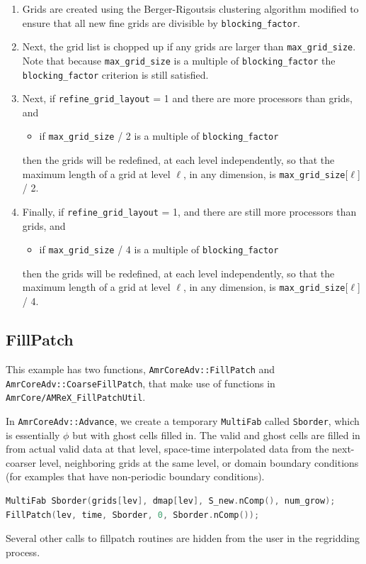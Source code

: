 \begin{enumerate}
\item Grids are created using the Berger-Rigoutsis clustering algorithm
modified to ensure that all new fine grids are divisible by {\tt blocking\_factor}.

\item Next, the grid list is chopped up if any grids are larger than {\tt max\_grid\_size}.
Note that because {\tt max\_grid\_size} is a multiple of {\tt blocking\_factor}
the {\tt blocking\_factor} criterion is still satisfied.

\item Next, if {\tt refine\_grid\_layout} = 1 and there are more processors than grids, and
\begin{itemize}
\item if {\tt max\_grid\_size} / 2 is a multiple of {\tt blocking\_factor}
\end{itemize}
then the grids will be redefined, at each level independently, so that the
maximum length of a grid at level $\ell$, in any dimension,
is {\tt max\_grid\_size}[$\ell$] / 2.

\item Finally, if {\tt refine\_grid\_layout} = 1,  and there are still more processors
than grids, and
\begin{itemize}
\item if {\tt max\_grid\_size} / 4 is a multiple of {\tt blocking\_factor}
\end{itemize}
then the grids will be redefined, at each level independently, so that the
maximum length of a grid at level $\ell$, in any dimension,
is {\tt max\_grid\_size}[$\ell$] / 4.

\end{enumerate}

\subsection{FillPatch}
This example has two functions, {\tt AmrCoreAdv::FillPatch} and {\tt AmrCoreAdv::CoarseFillPatch},
that make use of functions in {\tt AmrCore/AMReX\_FillPatchUtil}.

In {\tt AmrCoreAdv::Advance}, we create a temporary {\tt MultiFab} called {\tt Sborder}, which
is essentially $\phi$ but with ghost cells filled in.  The valid and ghost cells are filled in from
actual valid data at that level, space-time interpolated data from the next-coarser level, 
neighboring grids at the same level, or domain boundary conditions 
(for examples that have non-periodic boundary conditions).
\begin{lstlisting}[language=cpp]
MultiFab Sborder(grids[lev], dmap[lev], S_new.nComp(), num_grow);
FillPatch(lev, time, Sborder, 0, Sborder.nComp());
\end{lstlisting}
Several other calls to fillpatch routines are hidden from the user in the regridding process.
